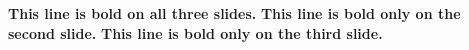 \documentclass{beamer}
\begin{document}
\begin{frame}
\textbf{This line is bold on all three slides.}
\textbf<2>{This line is bold only on the second slide.}
\textbf<3>{This line is bold only on the third slide.}
\end{frame}

\begin{frame}
\end{frame}

\end{document}
